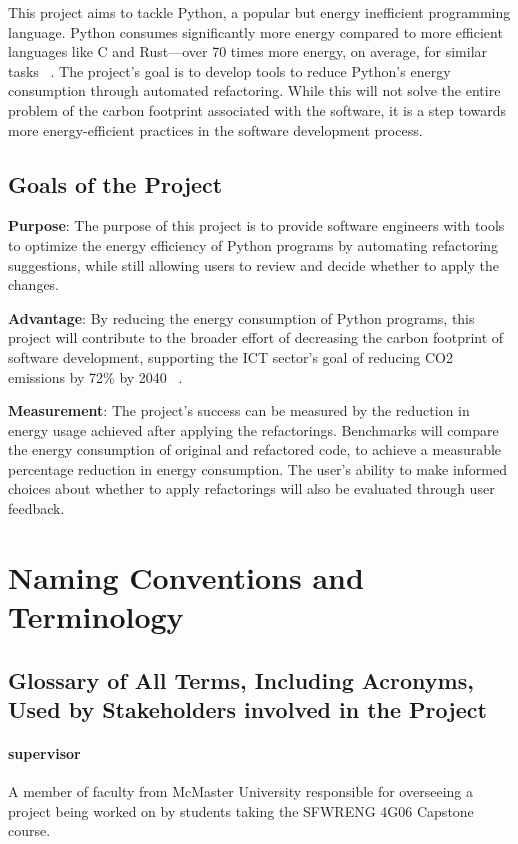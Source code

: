 \documentclass[12pt]{article}
\begin{document}
This project aims to tackle Python, a popular but energy inefficient programming language. Python consumes significantly more energy compared to more efficient languages like C and Rust—over 70 times more energy, on average, for similar tasks ~\citep{PereiraEtAl2017}. The project's goal is to develop tools to reduce Python's energy consumption through automated refactoring. While this will not solve the entire problem of the carbon footprint associated with the software, it is a step towards more energy-efficient practices in the software development process.

\subsection{Goals of the Project}
\noindent \textbf{Purpose}: The purpose of this project is to provide software engineers with tools to optimize the energy efficiency of Python programs by automating refactoring suggestions, while still allowing users to review and decide whether to apply the changes.

\noindent \textbf{Advantage}: By reducing the energy consumption of Python programs, this project will contribute to the broader effort of decreasing the carbon footprint of software development, supporting the ICT sector's goal of reducing CO2 emissions by 72\% by 2040 ~\citep{FreitagAndBernersLee2021}.

\noindent \textbf{Measurement}: The project's success can be measured by the reduction in energy usage 
achieved after applying the refactorings. Benchmarks will compare the energy consumption of original 
and refactored code, to achieve a measurable percentage reduction in energy consumption. The user's 
ability to make informed choices about whether to apply refactorings will also be evaluated through 
user feedback.

\section{Naming Conventions and Terminology}
\subsection{Glossary of All Terms, Including Acronyms, Used by Stakeholders
involved in the Project}

\paragraph*{supervisor}
A member of faculty from McMaster University responsible for overseeing a project being worked on by students taking the SFWRENG 4G06 Capstone course.
\end{document}
